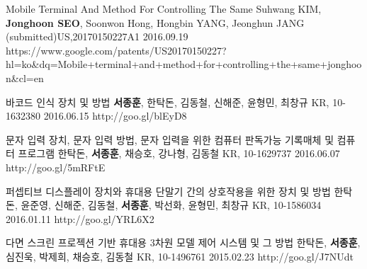 
\begin{cventries}
  \cvpatententry
    {Mobile Terminal And Method For Controlling The Same}
    {Suhwang KIM, \textbf{Jonghoon SEO}, Soonwon Hong, Hongbin YANG, Jeonghun JANG}
    {(submitted)US,20170150227A1}
    {2016.09.19}
    {https://www.google.com/patents/US20170150227?hl=ko&dq=Mobile+terminal+and+method+for+controlling+the+same+jonghoon&cl=en}

  \cvpatententry
    {바코드 인식 장치 및 방법} %
    {\textbf{서종훈}, 한탁돈, 김동철, 신해준, 윤형민, 최창규} %
    {KR, 10-1632380} %
    {2016.06.15} %
    {http://goo.gl/blEyD8}

  \cvpatententry
    {문자 입력 장치, 문자 입력 방법, 문자 입력을 위한 컴퓨터 판독가능 기록매체 및 컴퓨터 프로그램} %
    {한탁돈, \textbf{서종훈}, 채승호, 강나형, 김동철} %
    {KR, 10-1629737} %
    {2016.06.07} %
    {http://goo.gl/5mRFtE}

  \cvpatententry
    {퍼셉티브 디스플레이 장치와 휴대용 단말기 간의 상호작용을 위한 장치 및 방법} %
    {한탁돈, 윤준영, 신해준, 김동철, \textbf{서종훈}, 박선화, 윤형민, 최창규} %
    {KR, 10-1586034} %
    {2016.01.11} %
    {http://goo.gl/YRL6X2}

  \cvpatententry
    {다면 스크린 프로젝션 기반 휴대용 3차원 모델 제어 시스템 및 그 방법} %
    {한탁돈, \textbf{서종훈}, 심진욱, 박제희, 채승호, 김동철} %
    {KR, 10-1496761} %
    {2015.02.23} %
    {http://goo.gl/J7NUdt}


\end{cventries}
